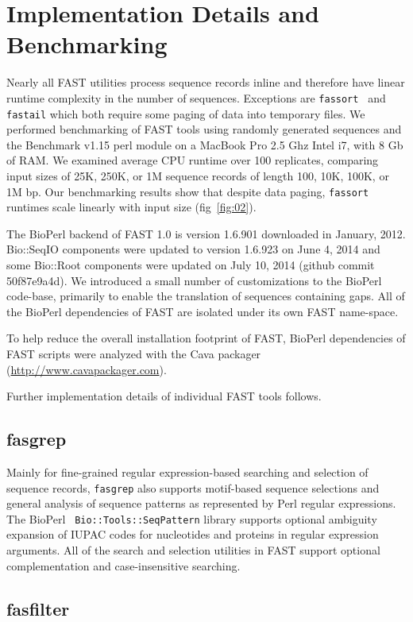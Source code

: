 \documentclass{frontiersSCNS} %
\begin{document}
\section{Implementation Details and Benchmarking}

Nearly all FAST utilities process sequence records inline and
therefore have linear runtime complexity in the number of
sequences. Exceptions are {\tt fassort } and {\tt fastail} which both
require some paging of data into temporary files. We performed
benchmarking of FAST tools using randomly generated sequences and the
Benchmark v1.15 perl module on a MacBook Pro 2.5 Ghz Intel i7, with 8
Gb of RAM. We examined average CPU runtime over 100 replicates,
comparing input sizes of 25K, 250K, or 1M sequence records of length
100, 10K, 100K, or 1M bp. Our benchmarking results show that despite
data paging, {\tt fassort} runtimes scale linearly with input size
(fig~\ref{fig:02}).

The BioPerl backend of FAST 1.0 is version 1.6.901 downloaded in
January, 2012. Bio::SeqIO components were updated to version 1.6.923
on June 4, 2014 and some Bio::Root components were updated on July 10,
2014 (github commit 50f87e9a4d).  We introduced a small number of
customizations to the BioPerl code-base, primarily to
enable the translation of sequences containing gaps. All of the
BioPerl dependencies of FAST are isolated under its own FAST
name-space.

To help reduce the overall installation footprint of FAST, BioPerl
dependencies of FAST scripts were analyzed with the Cava packager
(\url{http://www.cavapackager.com}).

Further implementation details of individual FAST tools follows.

\subsection{fasgrep}

Mainly for fine-grained regular expression-based searching and
selection of sequence records, {\tt fasgrep} also supports motif-based
sequence selections and general analysis of sequence patterns as
represented by Perl regular expressions. The BioPerl {\tt
  Bio::Tools::SeqPattern} library supports optional ambiguity
expansion of IUPAC codes for nucleotides and proteins in regular
expression arguments. All of the search and selection utilities in
FAST support optional complementation and case-insensitive searching.

\subsection{fasfilter}
 
\end{document}
